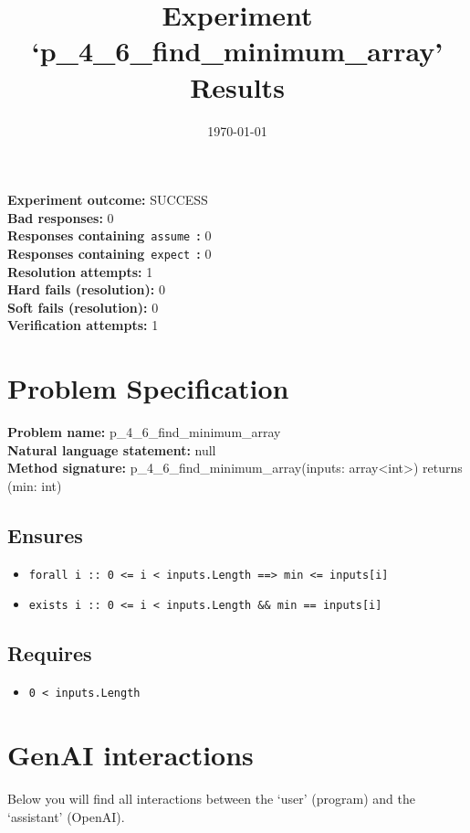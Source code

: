 \documentclass{article}
\begin{document}
\title{Experiment `p\_4\_6\_find\_minimum\_array' Results}
\author{\today}
\date{}
\maketitle
\textbf{Experiment outcome: }SUCCESS
\\\textbf{Bad responses: }0
\\\textbf{Responses containing}~\texttt{assume}~\textbf{: }0
\\\textbf{Responses containing}~\texttt{expect}~\textbf{: }0
\\\textbf{Resolution attempts: }1
\\\textbf{Hard fails (resolution): }0
\\\textbf{Soft fails (resolution): }0
\\\textbf{Verification attempts: }1
\section*{Problem Specification}
\textbf{Problem name: }p\_4\_6\_find\_minimum\_array
\\\textbf{Natural language statement: }null
\\\textbf{Method signature: }p\_4\_6\_find\_minimum\_array(inputs: array<int>) returns (min: int)
\subsection*{Ensures}
\begin{itemize}
\item \texttt{forall i :: 0 <= i < inputs.Length ==> min <= inputs[i]}
\item \texttt{exists i :: 0 <= i < inputs.Length \&\& min == inputs[i]}
\end{itemize}
\subsection*{Requires}
\begin{itemize}
\item \texttt{0 < inputs.Length}
\end{itemize}
\clearpage
\section*{GenAI interactions}
Below you will find all interactions between the `user' (program) and the `assistant' (OpenAI).
\end{document}
